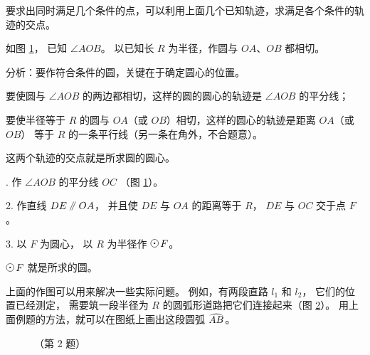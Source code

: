 要求出同时满足几个条件的点，可以利用上面几个已知轨迹，求满足各个条件的轨迹的交点。

\begin{figure}[htbp]
    \centering
    \begin{minipage}[b]{7cm}
        \centering
        
        \caption{}\label{fig:czjh2-7-83}
    \end{minipage}
    \qquad
    \begin{minipage}[b]{7cm}
        \centering
        
        \caption{}\label{fig:czjh2-7-84}
    \end{minipage}
\end{figure}


\liti[0] 如图 \ref{fig:czjh2-7-84}， 已知 $\angle AOB$。 以已知长 $R$ 为半径，作圆与 $OA$、$OB$ 都相切。

分析：要作符合条件的圆，关键在于确定圆心的位置。

要使圆与 $\angle AOB$ 的两边都相切，这样的圆的圆心的轨迹是 $\angle AOB$ 的平分线；

要使半径等于 $R$ 的圆与 $OA$（或 $OB$）相切，这样的圆心的轨迹是距离 $OA$（或 $OB$）
等于 $R$ 的一条平行线（另一条在角外，不合题意）。

这两个轨迹的交点就是所求圆的圆心。

. 作 $\angle AOB$ 的平分线 $OC$ （图 \ref{fig:czjh2-7-84}）。

2. 作直线 $DE \pingxing OA$， 并且使 $DE$ 与 $OA$ 的距离等于 $R$， $DE$ 与 $OC$ 交于点 $F$。

3. 以 $F$ 为圆心， 以 $R$ 为半径作 $\yuan\,F$。

$\yuan\,F$ 就是所求的圆。

上面的作图可以用来解决一些实际问题。
例如，有两段直路 $l_1$ 和 $l_2$， 它们的位置已经测定，
需要筑一段半径为 $R$ 的圆弧形道路把它们连接起来（图 \ref{fig:czjh2-7-85}）。
用上面例题的方法，就可以在图纸上画出这段圆弧 $\yuanhu{AB}$。

\begin{figure}[htbp]
    \centering
    \begin{minipage}[b]{7.5cm}
        \centering
        
        \caption{}\label{fig:czjh2-7-85}
    \end{minipage}
    \qquad
    \begin{minipage}[b]{7cm}
        \centering
        
        \caption*{（第 2 题）}
    \end{minipage}
\end{figure}


